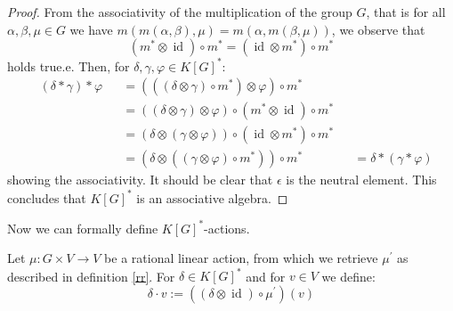 \begin{proof}
  From the associativity of the multiplication of the group $G$, that is for all $\alpha,\beta,\mu \in G$ we have $m(m(\alpha,\beta),\mu) = m(\alpha,m(\beta,\mu))$, we observe that
  \begin{equation}
    \left(m^\ast \otimes \operatorname{id} \right) \circ m^\ast = \left( \operatorname{id} \otimes m^\ast \right) \circ m^\ast
  \end{equation}
  holds true.e.
  Then, for $\delta, \gamma, \varphi \in K \left\lbrack G \right\rbrack^\ast$:
  \begin{equation}
    \begin{aligned}
      &\left( \delta \ast \gamma \right) \ast \varphi
      &&= \left( \left( \left( \delta \otimes \gamma \right) \circ m^\ast \right) \otimes \varphi \right) \circ m^\ast \\
      &&&= \left( (\delta \otimes \gamma) \otimes \varphi \right) \circ \left( m^\ast \otimes \operatorname{id} \right) \circ m^\ast  \\
      &&&= \left( \delta \otimes (\gamma \otimes \varphi) \right) \circ \left( \operatorname{id} \otimes m^\ast \right) \circ m^\ast  \\
      &&&= \left( \delta \otimes \left( \left( \gamma \otimes \varphi \right) \circ m^\ast \right) \right) \circ m^\ast  
      &&= \delta \ast \left( \gamma \ast \varphi \right)
    \end{aligned}
  \end{equation}
  showing the associativity.
  It should be clear that $\epsilon$ is the neutral element.
  This concludes that $K \left\lbrack G \right\rbrack^\ast$ is an associative algebra.
\end{proof}

Now we can formally define $K [G]^\ast$-actions.

\begin{definition}\label{da}
  Let $\mu \colon G \times V \rightarrow V$ be a rational linear action, from which we retrieve $\mu^\prime$ as described in definition \ref{rr}.
  For $\delta \in K[G]^\ast$ and for $v \in V$ we define:
  \begin{equation}
    \delta \cdot v := \left(\left( \delta \otimes \operatorname{id} \right) \circ \mu^\prime \right) \left(v\right)
  \end{equation}
\end{definition}

